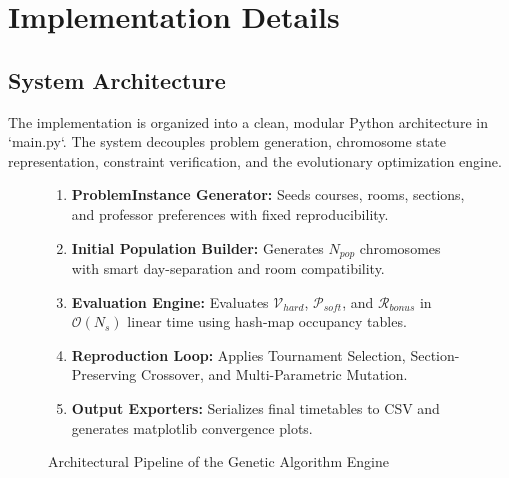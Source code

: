 
\chapter{Implementation Details}

\section{System Architecture}
The implementation is organized into a clean, modular Python architecture in `main.py`. The system decouples problem generation, chromosome state representation, constraint verification, and the evolutionary optimization engine.

\begin{figure}[H]
  \centering
  \begin{tcolorbox}[colback=PrismWhite, colframe=PrismHeader, width=0.95\linewidth, title=System Flow Architecture]
    \centering
    \small
    \begin{enumerate}[leftmargin=2.0em]
      \item \textbf{ProblemInstance Generator:} Seeds courses, rooms, sections, and professor preferences with fixed reproducibility.
      \item \textbf{Initial Population Builder:} Generates $N_{pop}$ chromosomes with smart day-separation and room compatibility.
      \item \textbf{Evaluation Engine:} Evaluates $\mathcal{V}_{hard}$, $\mathcal{P}_{soft}$, and $\mathcal{R}_{bonus}$ in $\mathcal{O}(N_s)$ linear time using hash-map occupancy tables.
      \item \textbf{Reproduction Loop:} Applies Tournament Selection, Section-Preserving Crossover, and Multi-Parametric Mutation.
      \item \textbf{Output Exporters:} Serializes final timetables to CSV and generates matplotlib convergence plots.
    \end{enumerate}
  \end{tcolorbox}
  \caption{Architectural Pipeline of the Genetic Algorithm Engine}
  \label{fig:pipeline_architecture}
\end{figure}

